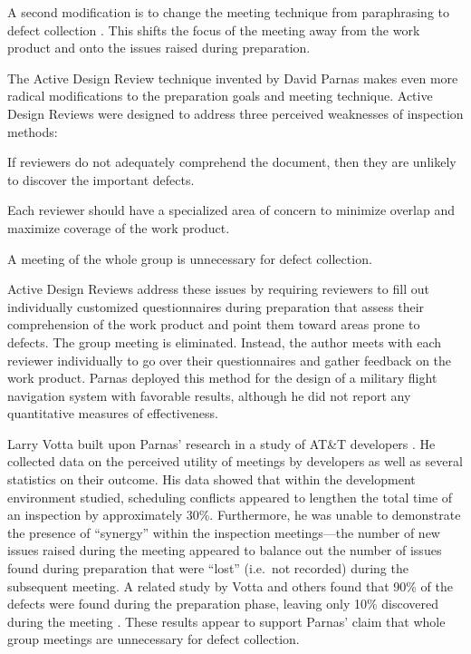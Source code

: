 A second modification is to change the meeting technique from paraphrasing
to defect collection \cite{Gilb93,Humphrey90}.  This shifts the focus of the
meeting away from the work product and onto the issues raised during
preparation. 

The Active Design Review technique \cite{Parnas85} invented by David Parnas
makes even more radical modifications to the preparation goals and meeting
technique. Active Design Reviews were designed to address three perceived
weaknesses of inspection methods:

\begin{smallitem}
\item If reviewers do not adequately comprehend the document, then they are
      unlikely to discover the important defects. 
\item Each reviewer should have a specialized area of concern to minimize 
      overlap and maximize coverage of the work product.
\item A meeting of the whole group is unnecessary for defect collection. 
\end{smallitem}

Active Design Reviews address these issues by requiring reviewers to fill
out individually customized questionnaires during preparation that assess
their comprehension of the work product and point them toward areas prone
to defects.  The group meeting is eliminated. Instead, the author meets
with each reviewer individually to go over their questionnaires and gather
feedback on the work product. Parnas deployed this method for the design
of a military flight navigation system with favorable results, although he
did not report any quantitative measures of effectiveness.

Larry Votta built upon Parnas' research in a study of AT\&T
developers \cite{Votta93}.  He collected data on the perceived utility of
meetings by developers as well as several statistics on their outcome. His
data showed that within the development environment studied, scheduling
conflicts appeared to lengthen the total time of an inspection by
approximately 30\%.  Furthermore, he was unable to demonstrate the presence
of ``synergy'' within the inspection meetings---the number of new issues
raised during the meeting appeared to balance out the number of issues
found during preparation that were ``lost'' (i.e.~not recorded) during the
subsequent meeting.  A related study by Votta and others found that 90\% of
the defects were found during the preparation phase, leaving only 10\%
discovered during the meeting \cite{Eick92}.  These results appear to
support Parnas' claim that whole group meetings are unnecessary for defect
collection.

